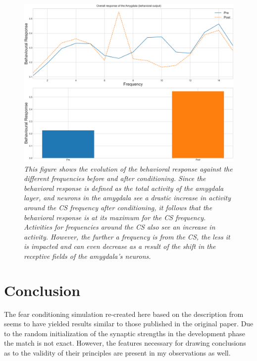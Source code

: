\begin{figure}[!htbp]
   \begin{center}
      \includegraphics[width=\textwidth]{Figs/behavioral_response}
      \caption{\textit{This figure shows the evolution of the behavioral response against the different frequencies before and after conditioning. Since the behavioral response is defined as the total activity of the amygdala layer, and neurons in the amygdala see a drastic increase in activity around the CS frequency after conditioning, it follows that the behavioral response is at its maximum for the CS frequency. Activities for frequencies around the CS also see an increase in activity. However, the further a frequency is from the CS, the less it is impacted and can even decrease as a result of the shift in the receptive fields of the amygdala's neurons.}}\label{fig:armony_behav_resp}
   \end{center}
\end{figure}

\section{Conclusion}
The fear conditioning simulation re-created here based on the description from~\citet{Armony1995} seems to have yielded results similar to those published in the original paper. Due to the random initialization of the synaptic strengths in the development phase the match is not exact. However, the features necessary for drawing conclusions as to the validity of their principles are present in my observations as well.\\

